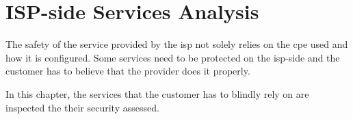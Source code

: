 \section{ISP-side Services Analysis}
\label{section:isp_svc_analysis}

The safety of the service provided by the \gls{isp} not solely relies on the \gls{cpe} used and how it is configured. Some services need to be protected on the \gls{isp}-side and the customer has to believe that the provider does it properly.

In this chapter, the services that the customer has to blindly rely on are inspected the their security assessed.



